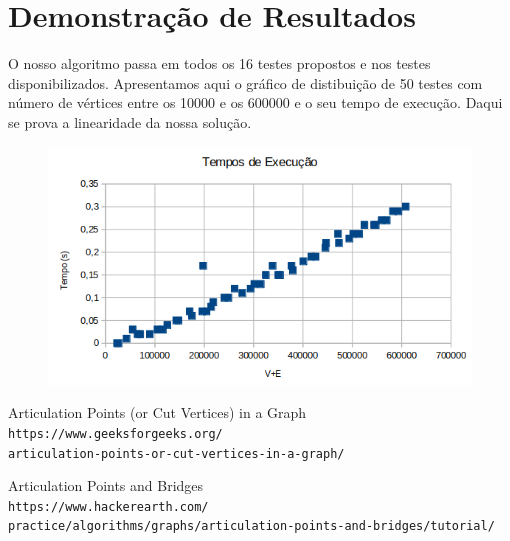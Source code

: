 \documentclass[12pt]{article}
\begin{document}
\section{Demonstração de Resultados}
O nosso algoritmo passa em todos os 16 testes propostos e nos testes disponibilizados. Apresentamos aqui o gráfico de distibuição de 50 testes com número de vértices entre
os 10000 e os 600000 e o seu tempo de execução. Daqui se prova a linearidade da nossa solução.

\begin{figure}[h]
\includegraphics[scale=0.5]{images/VandEGraph}
\centering
\end{figure}


\renewcommand\refname{Referências}
\begin{thebibliography}{9}        
    Articulation Points (or Cut Vertices) in a Graph
    \\\texttt{https://www.geeksforgeeks.org/\\
    articulation-points-or-cut-vertices-in-a-graph/}

    Articulation Points and Bridges
    \\\texttt{https://www.hackerearth.com/\\
    practice/algorithms/graphs/articulation-points-and-bridges/tutorial/}
\end{thebibliography}
\end{document}
